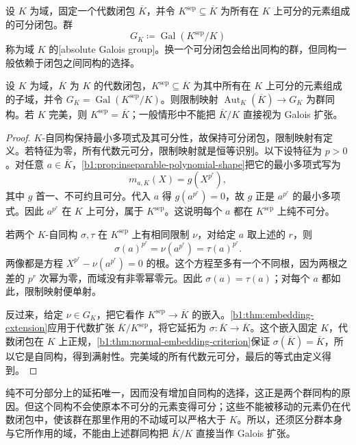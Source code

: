 \begin{definition}\label{b1:def:absolute-galois-group}
	设 \(K\) 为域，固定一个代数闭包 \(\overline K\)，并令 \(K^{\mathrm{sep}}\subseteq\overline K\) 为所有在 \(K\) 上可分的元素组成的可分闭包。群
	\[
		G_K\coloneqq\operatorname{Gal}(K^{\mathrm{sep}}/K)
	\]
	称为域 \(K\) 的[absolute Galois group]。换一个可分闭包会给出同构的群，但同构一般依赖于闭包之间同构的选择。
\end{definition}


\begin{proposition}\label{b1:prop:closure-automorphisms}
	设 \(K\) 为域，\(\overline K\) 为 \(K\) 的代数闭包，\(K^{\mathrm{sep}}\subseteq\overline K\) 为其中所有在 \(K\) 上可分的元素组成的子域，并令 \(G_K=\operatorname{Gal}(K^{\mathrm{sep}}/K)\)。则限制映射 \(\operatorname{Aut}_K(\overline K)\rightarrow G_K\) 为群同构。若 \(K\) 完美，则 \(K^{\mathrm{sep}}=\overline K\)；一般情形中不能把 \(\overline K/K\) 直接视为 Galois 扩张。
\end{proposition}
\begin{proof}
	\(K\)-自同构保持最小多项式及其可分性，故保持可分闭包，限制映射有定义。若特征为零，所有代数元可分，限制映射就是恒等识别。以下设特征为 \(p>0\)。对任意 \(a\in\overline K\)，\cref{b1:prop:inseparable-polynomial-shape}把它的最小多项式写为
	\[
		m_{a,K}(X)=g(X^{p^r}),
	\]
	其中 \(g\) 首一、不可约且可分。代入 \(a\) 得 \(g(a^{p^r})=0\)，故 \(g\) 正是 \(a^{p^r}\) 的最小多项式。因此 \(a^{p^r}\) 在 \(K\) 上可分，属于 \(K^{\mathrm{sep}}\)。这说明每个 \(a\) 都在 \(K^{\mathrm{sep}}\) 上纯不可分。

	若两个 \(K\)-自同构 \(\sigma,\tau\) 在 \(K^{\mathrm{sep}}\) 上有相同限制 \(\nu\)，对给定 \(a\) 取上述的 \(r\)，则
	\[
		\sigma(a)^{p^r}=\nu(a^{p^r})=\tau(a)^{p^r}.
	\]
	两像都是方程 \(X^{p^r}-\nu(a^{p^r})=0\) 的根。这个方程至多有一个不同根，因为两根之差的 \(p^r\) 次幂为零，而域没有非零幂零元。因此 \(\sigma(a)=\tau(a)\)；对每个 \(a\) 都如此，限制映射便单射。

	反过来，给定 \(\nu\in G_K\)，把它看作 \(K^{\mathrm{sep}}\rightarrow\overline K\) 的嵌入。\cref{b1:thm:embedding-extension}应用于代数扩张 \(\overline K/K^{\mathrm{sep}}\)，将它延拓为 \(\sigma:\overline K\rightarrow\overline K\)。这个嵌入固定 \(K\)，代数闭包在 \(K\) 上正规，\cref{b1:thm:normal-embedding-criterion}保证 \(\sigma(\overline K)=\overline K\)，所以它是自同构，得到满射性。完美域的所有代数元可分，最后的等式由定义得到。
\end{proof}
纯不可分部分上的延拓唯一，因而没有增加自同构的选择，这正是两个群同构的原因。但这个同构不会使原本不可分的元素变得可分；这些不能被移动的元素仍在代数闭包中，使该群在那里作用的不动域可以严格大于 \(K\)。所以，还须区分群本身与它所作用的域，不能由上述群同构把 \(\overline K/K\) 直接当作 Galois 扩张。

